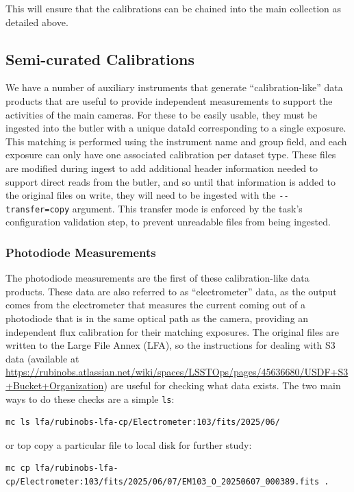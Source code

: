 \documentclass[DM,authoryear,toc]{lsstdoc}
\begin{document}
This will ensure that the calibrations can be chained into the main collection as detailed above.

\subsection{Semi-curated Calibrations}

We have a number of auxiliary instruments that generate ``calibration-like'' data products that are useful to provide independent measurements to support the activities of the main cameras.
For these to be easily usable, they must be ingested into the butler with a unique dataId corresponding to a single exposure.
This matching is performed using the instrument name and group field, and each exposure can only have one associated calibration per dataset type.
These files are modified during ingest to add additional header information needed to support direct reads from the butler, and so until that information is added to the original files on write, they will need to be ingested with the \verb|--transfer=copy| argument.
This transfer mode is enforced by the task's configuration validation step, to prevent unreadable files from being ingested.

\subsubsection{Photodiode Measurements}

The photodiode measurements are the first of these calibration-like data products.
These data are also referred to as ``electrometer'' data, as the output comes from the electrometer that measures the current coming out of a photodiode that is in the same optical path as the camera, providing an independent flux calibration for their matching exposures.
The original files are written to the Large File Annex (LFA), so the instructions for dealing with S3 data (available at \url{https://rubinobs.atlassian.net/wiki/spaces/LSSTOps/pages/45636680/USDF+S3+Bucket+Organization}) are useful for checking what data exists.
The two main ways to do these checks are a simple \verb|ls|:
\begin{verbatim}
mc ls lfa/rubinobs-lfa-cp/Electrometer:103/fits/2025/06/
\end{verbatim}
or top copy a particular file to local disk for further study:
\begin{verbatim}
mc cp lfa/rubinobs-lfa-cp/Electrometer:103/fits/2025/06/07/EM103_O_20250607_000389.fits .
\end{verbatim}
\end{document}
